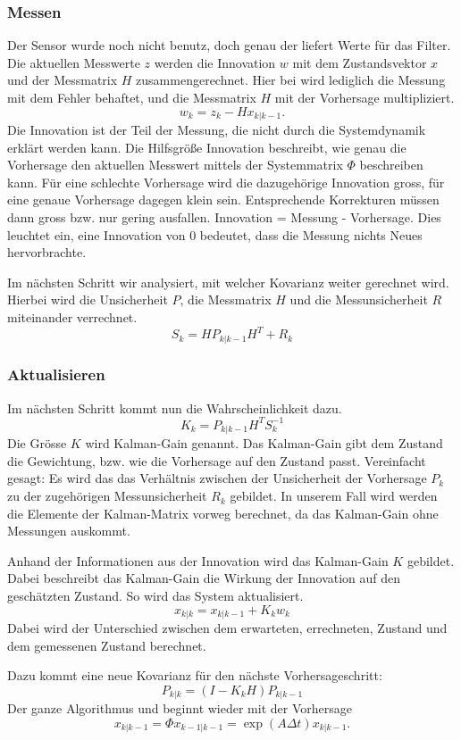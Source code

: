 \subsubsection*{Messen}
Der Sensor wurde noch nicht benutz, doch genau der liefert Werte für das Filter. 
Die aktuellen Messwerte $z$ werden die Innovation $w$ mit dem Zustandsvektor $x$ und der Messmatrix $H$ zusammengerechnet.
Hier bei wird lediglich die Messung mit dem Fehler behaftet, und die Messmatrix $H$ mit der Vorhersage multipliziert.
\[
{w_{k}}={z_{k}}-{H}{x_{k|k-1}}.
\] 
Die Innovation ist der Teil der Messung, die nicht durch die Systemdynamik erklärt werden kann. 
Die Hilfsgröße Innovation beschreibt, wie genau die Vorhersage den aktuellen Messwert mittels der Systemmatrix $\Phi$ beschreiben kann. 
Für eine schlechte Vorhersage wird die dazugehörige Innovation gross, für eine genaue Vorhersage dagegen klein sein. 
Entsprechende Korrekturen müssen dann gross bzw. nur gering ausfallen. 
Innovation = Messung - Vorhersage. Dies leuchtet ein, eine Innovation von 0 bedeutet, dass die Messung nichts Neues hervorbrachte.

Im nächsten Schritt wir analysiert, mit welcher Kovarianz weiter gerechnet wird. 
Hierbei wird die Unsicherheit $P$, die Messmatrix $H$ und die Messunsicherheit $R$ miteinander verrechnet. 
\[ 
{S_{k}}={H}{P_{k|k-1}}{H}^T+{R_{k}}
\] 

\subsubsection*{Aktualisieren}
Im nächsten Schritt kommt nun die Wahrscheinlichkeit dazu. 
\[{K_{k}}= {P_{k|k-1}} {H^T}{S_{k}^{-1}}\] 
Die Grösse $K$ wird Kalman-Gain genannt. 
Das Kalman-Gain gibt dem Zustand die Gewichtung, bzw. wie die Vorhersage auf den Zustand passt.
Vereinfacht gesagt: Es wird das das Verhältnis zwischen der Unsicherheit der Vorhersage $P_k$ zu der zugehörigen Messunsicherheit $R_k$ gebildet. 
In unserem Fall wird werden die Elemente der Kalman-Matrix vorweg berechnet, da das Kalman-Gain ohne Messungen auskommt. 

Anhand der Informationen aus der Innovation wird das Kalman-Gain $K$ gebildet. Dabei beschreibt das Kalman-Gain die Wirkung der Innovation auf den geschätzten Zustand. So wird das System aktualisiert.
\[
{x_{k|k}}={x_{k|k-1}}+{K_{k}}{w_{k}}
\] 
Dabei wird der Unterschied zwischen dem erwarteten, errechneten, Zustand und dem gemessenen Zustand berechnet.

Dazu kommt  eine neue Kovarianz für den nächste Vorhersageschritt:
\[
{P_{k|k}}=(I-{K_{k}}{H}){P_{k|k-1}} 
\] 
Der ganze Algorithmus und beginnt wieder mit der Vorhersage 
\[
{x_{k|k-1}}=\Phi{x_{k-1|k-1}}= \exp(A\Delta t){x_{k|k-1}}.
\] 


